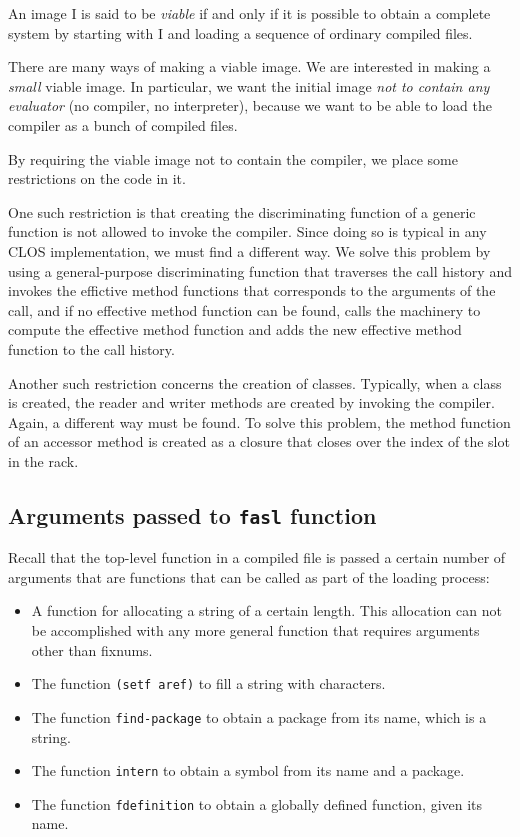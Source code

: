 An image I is said to be \emph{viable} if and only if it is possible
to obtain a complete \commonlisp{} system by starting with I and loading a
sequence of ordinary compiled files.

There are many ways of making a viable image.  We are interested in
making a \emph{small} viable image.  In particular, we want the
initial image \emph{not to contain any evaluator} (no compiler, no
interpreter), because we want to be able to load the compiler as a
bunch of compiled files.

By requiring the viable image not to contain the compiler, we place
some restrictions on the code in it.  

One such restriction is that creating the discriminating function of a
generic function is not allowed to invoke the compiler.  Since doing
so is typical in any CLOS implementation, we must find a different
way.  We solve this problem by using a general-purpose discriminating
function that traverses the call history and invokes the effictive
method functions that corresponds to the arguments of the call, and if
no effective method function can be found, calls the machinery to
compute the effective method function and adds the new effective
method function to the call history.

Another such restriction concerns the creation of classes.  Typically,
when a class is created, the reader and writer methods are created by
invoking the compiler.  Again, a different way must be found.  To solve
this problem, the method function of an accessor method is created
as a closure that closes over the index of the slot in the rack.

\subsection{Arguments passed to \texttt{fasl} function}
\label{sec-bootstrapping-arguments-to-fasl-function}

Recall that the top-level function in a compiled file is passed a
certain number of arguments that are functions that can be called as
part of the loading process:

\begin{itemize}
\item A function for allocating a string of a certain length.  This
  allocation can not be accomplished with any more general function
  that requires arguments other than fixnums.
\item The function \texttt{(setf aref)} to fill a string with
  characters.
\item The function \texttt{find-package} to obtain a package from its
  name, which is a string.
\item The function \texttt{intern} to obtain a symbol from its name
  and a package.
\item The function \texttt{fdefinition} to obtain a globally defined
  function, given its name.
\end{itemize}

